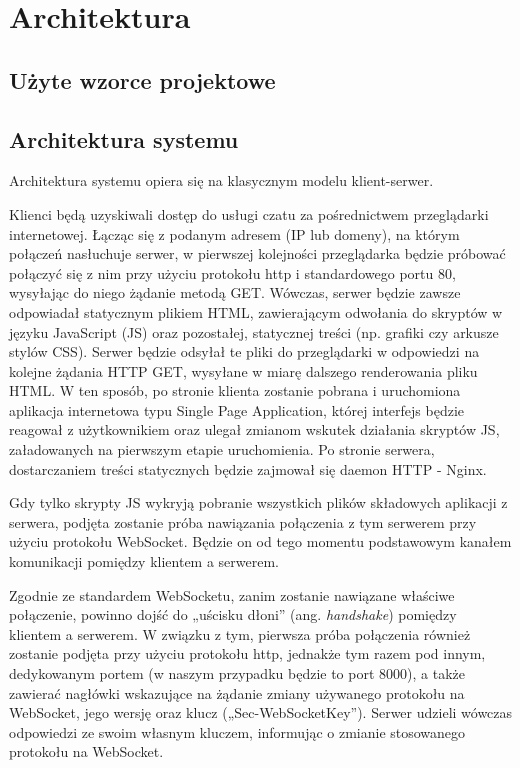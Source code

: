 \section{Architektura}

\subsection{Użyte wzorce projektowe}

\subsection{Architektura systemu}
\label{chat_architektura_systemu}

Architektura systemu opiera się na klasycznym modelu klient-serwer.

Klienci będą uzyskiwali dostęp do usługi czatu za pośrednictwem przeglądarki
internetowej. Łącząc się z podanym adresem (IP lub domeny), na którym połączeń
nasłuchuje serwer, w pierwszej kolejności przeglądarka będzie próbować połączyć
się z nim przy użyciu protokołu http i standardowego portu 80, wysyłając do
niego żądanie metodą GET. Wówczas, serwer będzie zawsze odpowiadał statycznym
plikiem HTML, zawierającym odwołania do skryptów w języku JavaScript (JS) oraz
pozostałej, statycznej treści (np. grafiki czy arkusze stylów CSS). Serwer
będzie odsyłał te pliki do przeglądarki w odpowiedzi na kolejne żądania HTTP
GET, wysyłane w miarę dalszego renderowania pliku HTML. W ten sposób, po stronie
klienta zostanie pobrana i uruchomiona aplikacja internetowa typu Single Page
Application, której interfejs będzie reagował z użytkownikiem oraz ulegał
zmianom wskutek działania skryptów JS, załadowanych na pierwszym etapie
uruchomienia. Po stronie serwera, dostarczaniem treści statycznych będzie
zajmował się daemon HTTP - Nginx.

Gdy tylko skrypty JS wykryją pobranie wszystkich plików składowych aplikacji
z serwera, podjęta zostanie próba nawiązania połączenia z tym serwerem przy
użyciu protokołu WebSocket. Będzie on od tego momentu podstawowym kanałem
komunikacji pomiędzy klientem a serwerem.

Zgodnie ze standardem WebSocketu, zanim zostanie nawiązane właściwe połączenie,
powinno dojść do „uścisku dłoni” (ang. \textit{handshake}) pomiędzy klientem a
serwerem. W związku z tym, pierwsza próba połączenia również zostanie podjęta
przy użyciu protokołu http, jednakże tym razem pod innym, dedykowanym portem
(w naszym przypadku będzie to port 8000), a także zawierać nagłówki wskazujące
na żądanie zmiany używanego protokołu na WebSocket, jego wersję oraz klucz
(„Sec-WebSocketKey”). Serwer udzieli wówczas odpowiedzi ze swoim własnym
kluczem, informując o zmianie stosowanego protokołu na WebSocket.

